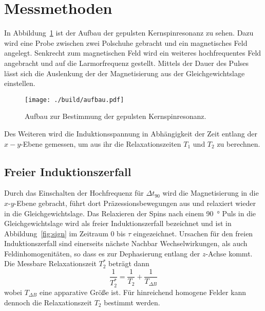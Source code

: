 \section{Messmethoden}%
\label{sec:messmethoden}
In Abbildung~\ref{fig:aufbau} ist der Aufbau der gepulsten Kernspinresonanz zu
sehen. 
Dazu wird eine Probe zwischen zwei Polschuhe gebracht und ein magnetisches Feld
angelegt.
Senkrecht zum magnetischen Feld wird ein weiteres hochfrequentes Feld angebracht
und auf die Larmorfrequenz gestellt. 
Mittels der Dauer des Pulses lässt sich die Auslenkung der
der Magnetisierung aus der Gleichgewichtslage einstellen. 
\begin{figure}[h]
		\centering
		\texttt{[image: ./build/aufbau.pdf]}
		\caption{Aufbau zur Bestimmung der gepulsten Kernspinresonanz.
		\cite{anleitung}}%
		\label{fig:aufbau}
\end{figure}
Des Weiteren wird die Induktionsspannung in Abhängigkeit der Zeit entlang der $x-y$-Ebene gemessen,
um aus ihr die Relaxationszeiten $T_1$ und $T_2$ zu berechnen.

\subsection{Freier Induktionszerfall}%
\label{sub:freie_induktionszerfall}
Durch das Einschalten der Hochfrequenz für $\Delta t_{90}$ wird die
Magnetisierung in die $x$-$y$-Ebene gebracht, führt dort Präzessionsbewegungen aus und 
relaxiert wieder in die Gleichgewichtslage. 
Das Relaxieren der Spins nach einem \SI{90}{\degree} Puls in die
Gleichgewichtslage wird als freier Induktionszerfall bezeichnet und ist in
Abbildung~\ref{fig:sign} im Zeitraum 0 bis $\tau$ eingezeichnet.
Ursachen für den freien Induktionszerfall sind einerseits nächste Nachbar
Wechselwirkungen, als auch Feldinhomogenitäten, so dass es zur Dephasierung
entlang der $z$-Achse kommt.
Die Messbare Relaxationszeit $T_2^*$ beträgt dann
\begin{equation}
		\frac{1}{T_2^*} = \frac{1}{T_2} + \frac{1}{T_{\Delta B}}
\end{equation}
wobei $T_{\Delta B}$ eine apparative Größe ist. 
Für hinreichend homogene Felder kann dennoch die Relaxationszeit $T_2$ 
bestimmt werden. 
